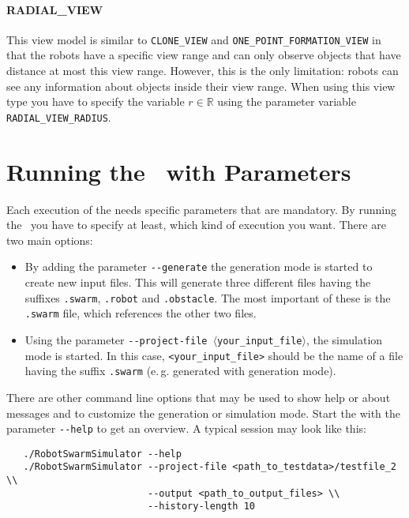 \paragraph{RADIAL\_VIEW} This view model is similar to \texttt{CLONE\_VIEW} and \texttt{ONE\_POINT\_FORMATION\_VIEW} in that the robots have a specific view range and can only observe objects that have distance at most this view range. However, this is the only limitation: robots can see any information about objects inside their view range. When using this view type you have to specify the variable $r \in \mathbb{R}$ using the parameter variable \texttt{RADIAL\_VIEW\_RADIUS}.


\section{Running the \RSS\ with Parameters}
Each execution of the \RSS needs specific parameters that are mandatory. By running the \RSS\ you have to specify at least, which kind of execution you want. There are two main options:

\begin{itemize}
	\item By adding the parameter {\tt -{}-generate} the generation mode is started to create new input files. This will generate three different files having the suffixes {\tt .swarm}, {\tt .robot} and {\tt .obstacle}. The most important of these is the {\tt .swarm} file, which references the other two files.
	\item Using the parameter {\tt -{}-project-file $\langle$your\_input\_file$\rangle$}, the simulation mode is started. In this case, \texttt{<your\_input\_file>} should be the name of a file having the suffix {\tt .swarm} (e.\,g. generated with generation mode).
\end{itemize}

There are other command line options that may be used to show help or about messages and to customize the generation or simulation mode. Start the \RSS with the parameter {\tt -{}-help} to get an overview. A typical session may look like this:

\begin{verbatim}
   ./RobotSwarmSimulator --help
   ./RobotSwarmSimulator --project-file <path_to_testdata>/testfile_2 \\
                         --output <path_to_output_files> \\
                         --history-length 10
\end{verbatim}

